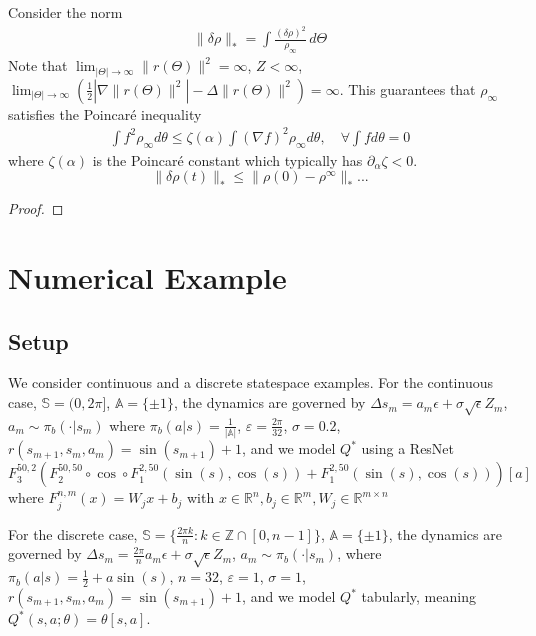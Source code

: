 \documentclass[10.5pt]{article}
\newcommand\bb{\mathbb}
\newtheorem{theorem}{Theorem}
\begin{document}
Consider the norm
\begin{align*}
  \|\delta \rho\|_* = \int \frac{(\delta \rho)^2}{\rho_\infty}\, d\Theta
\end{align*}
Note that $\lim_{|\Theta|\to \infty} \|r(\Theta)\|^2 = \infty$, $Z <\infty$, $\lim_{|\Theta|\to \infty}(\tfrac{1}{2}|\nabla \|r(\Theta)\|^2| - \Delta \|r(\Theta)\|^2 ) = \infty $.
This guarantees that $\rho_\infty$ satisfies the Poincar\'e inequality
\begin{align*}
  \int f^2 \rho_\infty d\theta \leq \zeta (\alpha) \int (\nabla f)^2 \rho_\infty d\theta, \quad \forall \int f d\theta = 0
\end{align*}
where $\zeta (\alpha)$ is the Poincar\'e constant which typically has $\partial_\alpha \zeta< 0 $.
\color{red}
$$
\| \delta \rho(t)\|_* \leq \|\rho(0) - \rho^\infty\|_*...
$$

\begin{proof}
\end{proof}
\color{black}
\section{Numerical Example}
\subsection{Setup}

We consider continuous and a discrete statespace examples. For the continuous case, $\bb S = (0, 2\pi]$, $\bb A = \{\pm 1\}$, the dynamics are governed by $\Delta s_{m} = a_m\epsilon + \sigma \sqrt{\epsilon} Z_m$, $a_m\sim \pi_b(\cdot|s_m)$
  where $\pi_b(a|s)=\tfrac{1}{|\mathbb A|}$, $\varepsilon = \tfrac{2\pi}{32}$, $\sigma = 0.2$, $r(s_{m+1},s_{m},a_m) = \sin(s_{m+1})+1$, and we model $Q^*$ using a ResNet
$$
F_3^{50,2}\left(F_2^{50,50}\circ \cos\circ F_1^{2,50}(\sin(s),\cos(s)) + F_1^{2,50}(\sin(s),\cos(s))\right)[a]
$$
where $F_j^{n,m}(x)=W_j x + b_j$ with $x\in \bb R^n, b_j\in \bb R^m, W_j\in \bb R^{m\times n}$

For the discrete case, $\bb S = \{\tfrac{2\pi k }{n}: k\in \mathbb Z \cap [0,n-1]\}$, $\bb A = \{\pm 1\}$, the dynamics are governed by $\Delta s_{m} = \tfrac{2\pi}{n}a_m\epsilon + \sigma \sqrt{\epsilon} Z_m$, $a_m\sim \pi_b(\cdot|s_m)$, where $\pi_b(a|s)=\tfrac{1}{2}+ a\sin(s)$, $n=32$, $\varepsilon=1$, $\sigma=1$, $r(s_{m+1},s_{m},a_m) = \sin(s_{m+1})+1$, and we model $Q^*$ tabularly, meaning $Q^*(s,a;\theta)= \theta[s,a]$.
\end{document}
